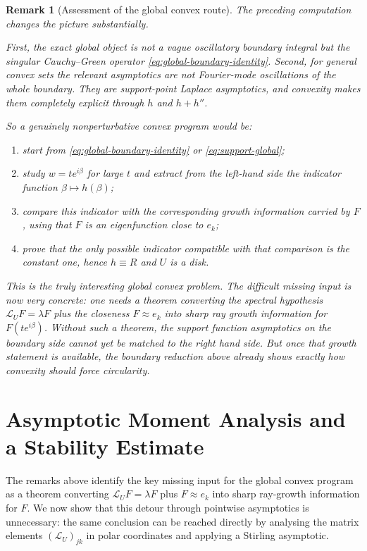 \documentclass[a4paper,11pt,reqno]{amsart}
\newtheorem{remark}{Remark}[section]
\begin{document}
\begin{remark}[Assessment of the global convex route]
The preceding computation changes the picture substantially.

First, the exact global object is not a vague oscillatory boundary integral but
the singular Cauchy--Green operator \eqref{eq:global-boundary-identity}. Second,
for general convex sets the relevant asymptotics are not Fourier-mode
oscillations of the whole boundary. They are support-point Laplace asymptotics,
and convexity makes them completely explicit through \(h\) and \(h+h''\).

So a genuinely nonperturbative convex program would be:
\begin{enumerate}
\item start from \eqref{eq:global-boundary-identity} or
\eqref{eq:support-global};
\item study \(w=t e^{i\beta}\) for large \(t\) and extract from the left-hand
side the indicator function \(\beta\mapsto h(\beta)\);
\item compare this indicator with the corresponding growth information carried by
\(F\), using that \(F\) is an eigenfunction close to \(e_k\);
\item prove that the only possible indicator compatible with that comparison is
the constant one, hence \(h\equiv R\) and \(U\) is a disk.
\end{enumerate}

This is the truly interesting global convex problem. The difficult missing input
is now very concrete: one needs a theorem converting the spectral hypothesis
\(\mathcal L_UF=\lambda F\) plus the closeness \(F\approx e_k\) into sharp ray
growth information for \(F(t e^{i\beta})\). Without such a theorem, the support
function asymptotics on the boundary side cannot yet be matched to the right
hand side. But once that growth statement is available, the boundary reduction
above already shows exactly how convexity should force circularity.
\end{remark}

\section{Asymptotic Moment Analysis and a Stability Estimate}

The remarks above identify the key missing input for the global convex program as a theorem converting
$\mathcal{L}_UF=\lambda F$ plus $F\approx e_k$ into sharp ray-growth information for $F$.
We now show that this detour through pointwise asymptotics is unnecessary: the same
conclusion can be reached directly by analysing the matrix elements
$(\mathcal{L}_U)_{jk}$ in polar coordinates and applying a Stirling asymptotic.
\end{document}
